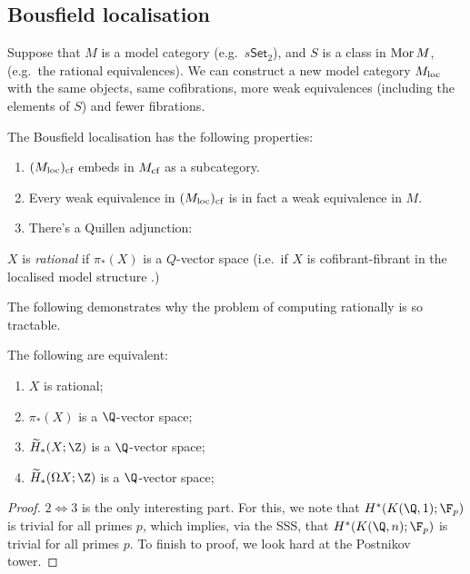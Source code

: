 \documentclass[11pt]{article}
\begin{document}
\begin{JeremyRationalHomotopyPractice}
\subsection*{Bousfield localisation}
Suppose that $M$ is a model category (e.g.\ $s\mathsf{Set}_2$), and $S$ is a class in $\operatorname{Mor} M$, (e.g.\ the rational equivalences). We can construct a new model category $M_{\textup{loc}}$ with the same objects, same cofibrations, more weak equivalences (including the elements of $S$) and fewer fibrations. 
\begin{prop*}
The Bousfield localisation has the following properties:
\begin{enumerate}\squishlist
\item $(M_{\textup{loc}})_{\textup{cf}}$ embeds in $M_{\textup{cf}}$ as a subcategory.
\item Every weak equivalence in  $(M_{\textup{loc}})_{\textup{cf}}$ is in fact a weak equivalence in $M$.
\item There's a Quillen adjunction:
\end{enumerate}
\end{prop*}
\begin{defn*}
$X$ is \emph{rational} if $\pi_*(X)$ is a $Q$-vector space (i.e.\ if $X$ is cofibrant-fibrant in the localised model structure .)
\end{defn*}
The following demonstrates why the problem of computing rationally is so tractable.
\begin{thm*}
The following are equivalent:
\begin{enumerate}\squishlist
\item $X$ is rational;
\item $\pi_*(X)$ is a $\Q$-vector space;
\item $\widetilde{H}_{*}(X;\Z)$ is a $\Q$-vector space;
\item $\widetilde{H}_{*}(\Omega X;\Z)$ is a $\Q$-vector space;
\end{enumerate}
\end{thm*}
\begin{proof}
$2\iff 3$ is the only interesting part. For this, we note that ${H}^{*}(K(\Q,1);\F_p)$ is trivial for all primes $p$, which implies, via the SSS, that ${H}^{*}(K(\Q,n);\F_p)$ is trivial for all primes $p$. To finish to proof, we look hard at the Postnikov tower.

\end{proof}
\end{JeremyRationalHomotopyPractice}
\end{document}

